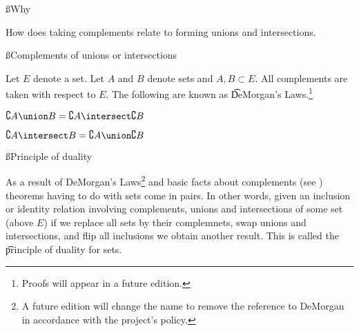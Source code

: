 
\ss{Why}

How does taking complements relate to forming unions and intersections.

\ss{Complements of unions or intersections}

Let $E$ denote a set.
Let $A$ and $B$ denote sets and $A, B \subset E$.
All complements are taken with respect to $E$.
The following are known as \t{DeMorgan's Laws}.\footnote{Proofs will appear in a future edition.}

\begin{proposition}
  $\complement{A \union B} = \complement{A} \intersect \complement{B}$
\end{proposition}

\begin{proposition}
  $\complement{A \intersect B} = \complement{A} \union \complement{B}$
\end{proposition}

\ss{Principle of duality}

As a result of DeMorgan's Laws\footnote{A future edition will change the name to remove the reference to DeMorgan in accordance with the project's policy.} and basic facts about complements (see ) theorems having to do with sets come in pairs.
In other words, given an inclusion or identity relation involving complements, unions and intersections of some set (above $E$) if we replace all sets by their complemnets, swap unions and intersections, and flip all inclusions we obtain another result.
This is called the \t{principle of duality for sets}.

\blankpage
